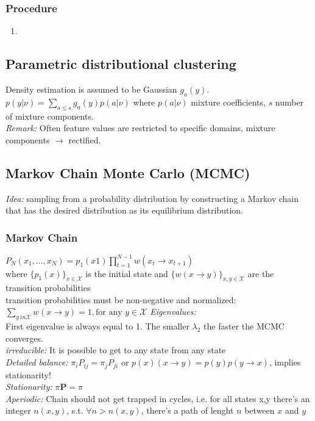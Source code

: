 \documentclass[9pt,parskip]{scrartcl}
\begin{document}
\begin{multicols*}{4}
\subsubsection*{Procedure}
\begin{enumerate}
	\item 
\end{enumerate}

\subsection*{Parametric distributional clustering}
Density estimation is assumed to be Gaussian $g_a(y)$. \\
$p(y| \nu) = \sum_{a \leq s} g_a(y) p(a|\nu)$ where $p(a|\nu)$ mixture coefficients, $s$ number of mixture components.\\
\textit{Remark:} Often feature values are restricted to specific domains, mixture components $\to$ rectified.


\subsection*{Markov Chain Monte Carlo (MCMC)}
\textit{Idea:} sampling from a probability distribution by constructing a Markov chain that has the desired distribution as its equilibrium distribution. 

\subsubsection*{Markov Chain}

$P_N (x_1,... ,x_N ) = p_1(x1) \prod^{N-1}_{t=1} w(x_t \to x_{t+1})$ \\ 
where $\{p_1(x)\}_{x \in \mathcal{X}}$ is the initial state and $\{w(x \to y)\}_{x,y \in \mathcal{X}}$ are the
transition probabilities \\
 transition probabilities must be
non-negative and normalized:
$\sum_{y \ in \mathcal{X}} w(x \to y) = 1 , \text{for any } y \in \mathcal{X}$
\textit{Eigenvalues: }\\
First eigenvalue is always equal to 1. The smaller $\lambda_2$ the faster the MCMC converges. \\
\textit{irreducible: } It is possible to get to any state from any state \\
\textit{Detailed balance: } $\pi _{i}P_{ij}=\pi _{j}P_{ji}$ or $p(x) (x \to y) = p(y) p(y \to x)$, implies stationarity! \\
\textit{Stationarity: } $\pi \mathbf {P} =\pi$ \\
\textit{Aperiodic: } Chain should not get trapped in cycles, i.e. for all states x,y there's an integer $n(x,y)$, s.t. $\forall n > n(x,y)$, there's a path of lenght $n$ between $x$ and $y$ \\



\end{multicols*}
\end{document}
